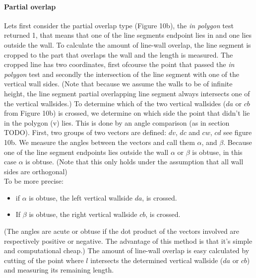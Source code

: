 \documentclass[10pt]{article}
\begin{document}
	\paragraph{Partial overlap}
	Lets first consider the partial overlap type (Figure 10b), the \emph{in polygon} test
	returned 1, that means that one of the line segments endpoint lies in
	and one lies outside the wall.
	To calculate the amount of line-wall overlap, the line segment is cropped to the
	part that overlaps the wall and the length is measured. 
	The cropped line has two coordinates, first ofcourse the point that passed
	the \emph{in polygon} test and secondly the intersection of the line
	segment with one of the vertical wall sides.
	(Note that because we assume the walls to be of infinite height, the line
	segment partial overlapping line segment always intersects one of the
	vertical wallsides.)
	To determine which of the two vertical wallsides ($da$ or $cb$ from Figure 10b)
	 is crossed, we determine on which side the point that didn't lie in the polygon (v) lies.
	This is done by an angle comparison (as in section TODO).
	First, two groups of two vectors are defined: $dv$, $dc$ and $cw$, $cd$ see figure 10b.
	We measure the angles between the vectors and call them $\alpha$, and
	$\beta$. 
	Because one of the line segment endpoints lies outside
	the wall $\alpha$ or $\beta$ is obtuse, in this case $\alpha$ is obtuse.
	(Note that this only holds under the assumption that all wall sides are orthogonal)\\
	To be more precise: 
	\begin{itemize}
	\item if $\alpha$ is obtuse, the left vertical wallside $da$, is
	crossed. \\
	\item If $\beta$ is obtuse, the right vertical wallside $cb$, is
	crossed. \\
	\end{itemize}
	(The angles are acute or obtuse if the dot product of the vectors involved
	are respectively positive or negative. The advantage of this method is that
	it's simple and computational cheap.)
	The amount of line-wall overlap is easy calculated by cutting of the
	point where $l$ intersects the determined vertical wallside ($da$ or
	$cb$) and measuring its remaining length.
\end{document}
